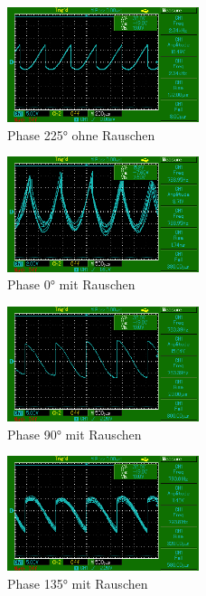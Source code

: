 \begin{figure}
    \centering
    \includegraphics[width=0.5\textwidth]{bilder/MAP004.png}
    \caption{Phase 225° ohne Rauschen}        
    \label{fig:MAP004}
\end{figure}

\begin{figure}
    \centering
    \includegraphics[width=0.5\textwidth]{bilder/MAP007.png}
    \caption{Phase 0° mit Rauschen}        
    \label{fig:MAP007}
\end{figure}


\begin{figure}
    \centering
    \includegraphics[width=0.5\textwidth]{bilder/MAP009.png}
    \caption{Phase 90° mit Rauschen}        
    \label{fig:MAP009}
\end{figure}

\begin{figure}
    \centering
    \includegraphics[width=0.5\textwidth]{bilder/MAP010.png}
    \caption{Phase 135° mit Rauschen}        
    \label{fig:MAP010}
\end{figure}


